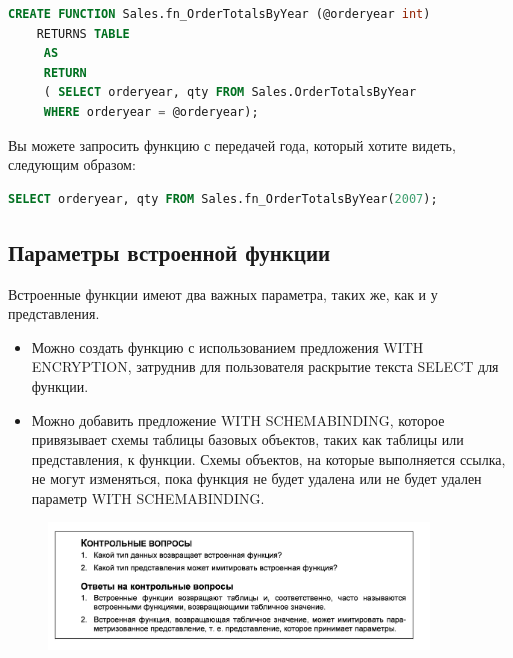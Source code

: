 \begin{lstlisting}[label=lst:funcReturn, language=sql]
	CREATE FUNCTION Sales.fn_OrderTotalsByYear (@orderyear int)
	RETURNS TABLE
	 AS
	 RETURN
	 ( SELECT orderyear, qty FROM Sales.OrderTotalsByYear
	 WHERE orderyear = @orderyear);
\end{lstlisting}

Вы можете запросить функцию с передачей года, который хотите видеть, следующим образом: 

\begin{lstlisting}[label=lst:funcReturn, language=sql]
	SELECT orderyear, qty FROM Sales.fn_OrderTotalsByYear(2007);
\end{lstlisting}

\subsection{Параметры встроенной функции}

Встроенные функции имеют два важных параметра, таких же, как и у представления. 

\begin{itemize}
	\item Можно создать функцию с использованием предложения WITH ENCRYPTION, затруднив для пользователя раскрытие текста SELECT для функции. 
	\item Можно добавить предложение WITH SCHEMABINDING, которое привязывает схемы
	таблицы базовых объектов, таких как таблицы или представления, к функции.
	Схемы объектов, на которые выполняется ссылка, не могут изменяться, пока
	функция не будет удалена или не будет удален параметр WITH SCHEMABINDING. 
\end{itemize}

\begin{figure}[h!]
	\begin{center}
		\includegraphics[width=0.9\textwidth]{img/control19.png}
	\end{center}
	\captionsetup{justification=centering}
\end{figure}


